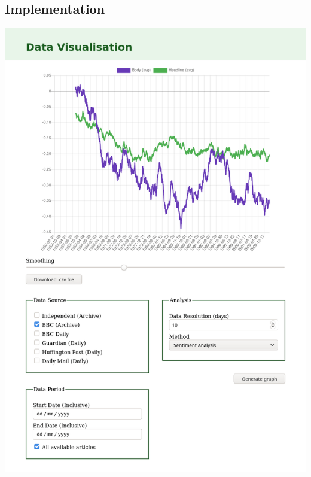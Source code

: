 \documentclass[12pt,a4paper]{article}
\begin{document}
\begin{appendices}
\begin{subappendices}
\subsection{Implementation} \label{app:vis-implementation}
\includegraphics[width=\linewidth]{../visualisation/implementation.png}
\end{subappendices}

\end{appendices}
\end{document}
